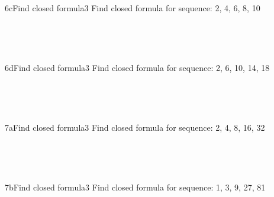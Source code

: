 \documentclass[a4paper,12pt]{book}
\begin{document}
    ~\\
    
    \hrulefill
    
    ~\\
    \begin{answersheetquestion}{6c}{Find closed formula}{3}
        Find closed formula for sequence: 2, 4, 6, 8, 10
        \iftoggle{answerkey}{ \begin{answer} $a_{n} = a_{n-1} + 2$ \end{answer} }{ { ~\\ \raisebox{0pt}[2cm][0pt]{  } } }
    \end{answersheetquestion}

    ~\\
    
    \hrulefill
    
    ~\\
    \begin{answersheetquestion}{6d}{Find closed formula}{3}
        Find closed formula for sequence: 2, 6, 10, 14, 18
        \iftoggle{answerkey}{ \begin{answer} $a_{n} = a_{n-1} + 4$ \end{answer} }{ { ~\\ \raisebox{0pt}[2cm][0pt]{  } } }
    \end{answersheetquestion}

    ~\\
    
    \hrulefill
    
    ~\\
    \begin{answersheetquestion}{7a}{Find closed formula}{3}
        Find closed formula for sequence: 2, 4, 8, 16, 32
        \iftoggle{answerkey}{ \begin{answer} $a_{n} = 2 \cdot a_{n-1}$ \end{answer} }{ { ~\\ \raisebox{0pt}[2cm][0pt]{  } } }
    \end{answersheetquestion}

    ~\\
    
    \hrulefill
    
    ~\\
    \begin{answersheetquestion}{7b}{Find closed formula}{3}
        Find closed formula for sequence: 1, 3, 9, 27, 81
        \iftoggle{answerkey}{ \begin{answer} $a_{n} = 3 \cdot a_{n-1}$ \end{answer} }{ { ~\\ \raisebox{0pt}[2cm][0pt]{  } } }
    \end{answersheetquestion}
\end{document}
